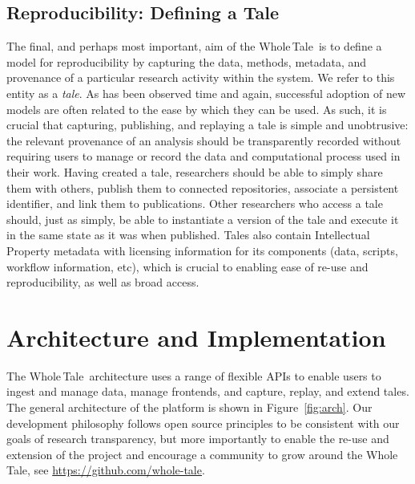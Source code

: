 \documentclass[review]{elsarticle}
\newcommand{\wt}{Whole\,Tale}
\begin{document}
\subsection{Reproducibility: Defining a Tale}

The final, and perhaps most important, aim of the \wt\ is to 
define a model for reproducibility by capturing the data, methods, metadata, and provenance of a particular research activity within the system. We refer to this entity as
a \emph{tale}. As has been observed time and again, successful adoption of 
new models are often related to the ease by which they can be used. As such, 
it is crucial that capturing, publishing, and replaying a tale is simple and unobtrusive: the relevant
provenance of an analysis should be transparently recorded 
without requiring users to manage or record the data and computational
process used in their work.
Having created a tale, researchers should be able to simply share
them with others, publish them to connected repositories, associate
a persistent identifier, and link them to publications. Other researchers
who access a tale should, just as simply, be able to instantiate a version
of the tale and execute it in the same state as it was when published. Tales also contain Intellectual Property metadata with licensing information for its components (data, scripts, workflow information, etc), which is crucial to enabling ease of re-use and reproducibility, as well as broad access.



\section{Architecture and Implementation}\label{sec:architecture}

The \wt\ architecture uses a range of flexible APIs to enable users to ingest and manage data, 
manage frontends, and capture, replay, and extend tales.  The general architecture
of the platform is shown in Figure~\ref{fig:arch}. Our development philosophy follows open source principles to be consistent with our goals of research transparency, but more importantly to enable the re-use and extension of the project and encourage a community to grow around the \wt, see \url{https://github.com/whole-tale}.
\end{document}
